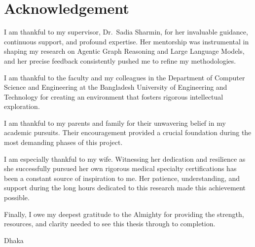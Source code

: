  {}
\section*{\centering Acknowledgement}

I am thankful to my supervisor, Dr.\ Sadia Sharmin, for her invaluable guidance,
continuous support, and profound expertise. Her mentorship was instrumental in
shaping my research on Agentic Graph Reasoning and Large Language Models, and
her precise feedback consistently pushed me to refine my methodologies.

I am thankful to the faculty and my colleagues in the Department of Computer
Science and Engineering at the Bangladesh University of Engineering and
Technology for creating an environment that fosters rigorous intellectual
exploration.

I am thankful to my parents and family for their unwavering belief in my
academic pursuits. Their encouragement provided a crucial foundation during the
most demanding phases of this project.

I am especially thankful to my wife. Witnessing her dedication and resilience as
she successfully pursued her own rigorous medical specialty certifications has
been a constant source of inspiration to me. Her patience, understanding, and
support during the long hours dedicated to this research made this achievement
possible.

Finally, I owe my deepest gratitude to the Almighty for providing the strength,
resources, and clarity needed to see this thesis through to completion.

\vspace*{20.0mm}

\begin{minipage}[t]{0.3\textwidth}
  \raggedright Dhaka\par \thesislongdate
\end{minipage}%
\hfill
\begin{minipage}[t]{0.45\textwidth}
  \CandidateName\par \CandidateID
\end{minipage}

\endinput

